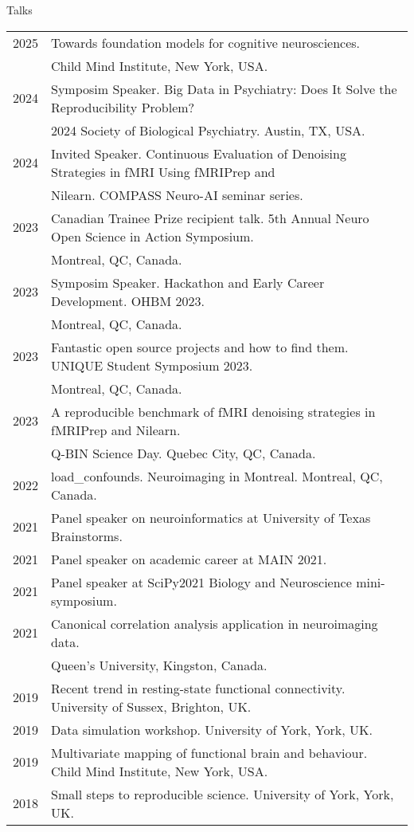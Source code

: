 \documentclass{resume} %
\begin{document}
\begin{rSection}{Talks}
  \begin{tabular}{@{} l l @{\hspace{10ex}}}
 	2025 & Towards foundation models for cognitive neurosciences. \\
 	&Child Mind Institute, New York, USA. \\
    2024 & Symposim Speaker. Big Data in Psychiatry: Does It Solve the Reproducibility Problem? \\ & 2024 Society of Biological Psychiatry. Austin, TX, USA.\\
    2024 & Invited Speaker. Continuous Evaluation of Denoising Strategies in fMRI Using fMRIPrep and\\
 	&Nilearn. COMPASS Neuro-AI seminar series.\\
    2023 & Canadian Trainee Prize recipient talk. 5th Annual Neuro Open Science in Action Symposium. \\ & Montreal, QC, Canada.\\
    2023 & Symposim Speaker. Hackathon and Early Career Development. OHBM 2023. \\&Montreal, QC, Canada.\\
    2023 & Fantastic open source projects and how to find them. UNIQUE Student Symposium 2023. \\&Montreal, QC, Canada.\\
    2023 & A reproducible benchmark of fMRI denoising strategies in fMRIPrep and Nilearn. \\ & Q-BIN Science Day. Quebec City, QC, Canada.\\
   	2022 & load\_confounds. Neuroimaging in Montreal. Montreal, QC, Canada.\\
    2021 & Panel speaker on neuroinformatics at University of Texas Brainstorms.\\
    2021 & Panel speaker on academic career at MAIN 2021. \\
    2021 & Panel speaker at SciPy2021 Biology and Neuroscience mini-symposium. \\
  	2021 & Canonical correlation analysis application in neuroimaging data. \\&Queen's University, Kingston, Canada. \\
    2019 & Recent trend in resting-state functional connectivity. University of Sussex, Brighton, UK. \\
    2019 & Data simulation workshop. University of York, York, UK. \\
    2019 & Multivariate mapping of functional brain and behaviour. Child Mind Institute, New York, USA. \\
    2018 & Small steps to reproducible science. University of York, York, UK. \\
  \end{tabular}
\end{rSection}
\end{document}
